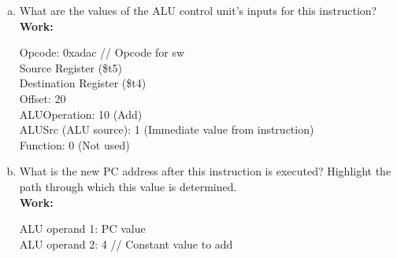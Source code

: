 \documentclass[11pt]{article}
\begin{document}
\begin{enumerate}[(a)]
    \item What are the values of the ALU control unit's inputs for this instruction?\\
    \textbf{Work:}
    \begin{center}
        Opcode: 0xadac // Opcode for sw\\
        Source Register (\$t5)\\
        Destination Register (\$t4)\\
        Offset: 20\\
        ALUOperation: 10 (Add)\\
        ALUSrc (ALU source): 1 (Immediate value from instruction)\\
        Function: 0 (Not used)\\
    \end{center}

    \item What is the new PC address after this instruction is executed? Highlight the path through which this value is determined.\\
    \textbf{Work:}
    \begin{center}
        ALU operand 1: PC value\\
        ALU operand 2: 4 // Constant value to add \\
    \end{center}


\end{enumerate}
\end{document}
